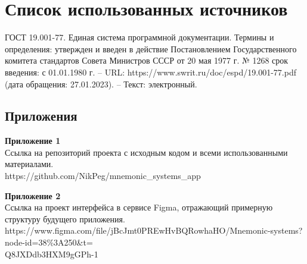 \documentclass[draft]{article}
\newcommand\zz[1]{\par{\normalsize\strut #1} \hfill\ignorespaces}
\begin{document}
\section*{Список использованных источников}
\begin{thebibliography}{}
 ГОСТ 19.001-77. Единая система программной документации. Термины и определения: утвержден и введен в действие Постановлением Государственного комитета стандартов Совета Министров СССР от 20 мая 1977 г. № 1268 срок введения: с 01.01.1980 г. – URL: https://www.swrit.ru/doc/espd/19.001-77.pdf (дата обращения: 27.01.2023). – Текст: электронный.
\end{thebibliography}
\newpage
\begin{center}
\section*{Приложения}
\end{center}
\zz{}\textbf{Приложение 1\\}
Ссылка на репозиторий проекта с исходным кодом и всеми использованными материалами.\\
https://github.com/NikPeg/mnemonic\_systems\_app\\
\zz{}\textbf{Приложение 2\\}
Ссылка на проект интерфейса в сервисе Figma, отражающий примерную структуру будущего приложения.\\
https://www.figma.com/file/jBcJmt0PREwHvBQRowhaHO/Mnemonic-systems?node-id=38\%3A250\&t=\\
Q8JXDdb3HXM9gGPh-1\\
\end{document}
